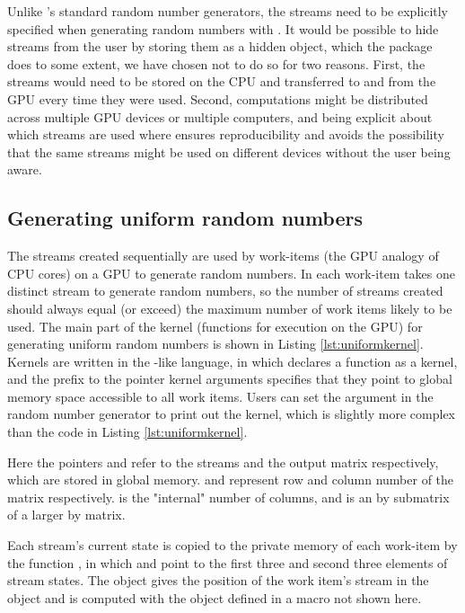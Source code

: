 \documentclass[article,nojss]{jss}\usepackage[]{graphicx}\usepackage[]{color}
\newcommand{\fct}[1]{\code{#1()}}
\begin{document}
Unlike 's standard random number generators, the streams need to be explicitly specified when generating random numbers with .  It would be possible to hide streams from the user by storing them as a hidden object, which the  package does to some extent, we have chosen not to do so for two reasons.  First, the streams would need to be stored on the CPU and transferred to and from the GPU every time they were used.
Second, computations might be distributed across multiple GPU devices or multiple computers, and being explicit about which streams are used where ensures reproducibility and avoids the possibility that the same streams might be used on different devices without the user being aware.







\subsection{Generating uniform random numbers}

The streams created sequentially are used by work-items (the GPU analogy of CPU cores) on a GPU to generate random numbers. In  each work-item takes one distinct stream to generate random numbers, so the number of streams created should always equal (or exceed) the maximum number of work items likely to be used. The main part of the kernel (functions for execution on the GPU) for generating uniform random numbers is shown in Listing \ref{lst:uniformkernel}. Kernels are written in the -like  language, in which  declares a function as a kernel, and the  prefix to the pointer kernel arguments specifies that they point to global memory space accessible to all work items.  Users can set the argument  in the random number generator to print out the kernel, which is slightly more complex than the code in Listing \ref{lst:uniformkernel}. 
  
Here the pointers  and  refer to the streams and the  output matrix respectively, which are stored in global memory.  and  represent row and column number of the matrix  respectively.    is the "internal" number of columns, and  is an  by  submatrix of a larger  by  matrix.

Each stream's current state is copied to the private memory of each work-item by the function \fct{streamsToPrivate}, in which  and  point to the first three and second three elements of stream states.
The object  gives the position of the work item's stream in the  object and is computed with the
 object defined in a macro not shown here.   
\end{document}
